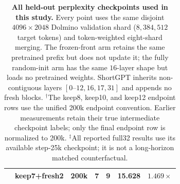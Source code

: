 \begin{table}[t]
{\begin{tabular}{@{}llrrrrr@{}}
& keep7+fresh2 & 200k & 7 & 9 & 15.628 & $1.469\times$ \\
\bottomrule
\end{tabular}%
}
\caption{\textbf{All held-out perplexity checkpoints used in this study.}
Every point uses the same disjoint $4096\times2048$ Dolmino validation shard
($8{,}384{,}512$ target tokens) and token-weighted eight-shard merging. The
frozen-front arm retains the same pretrained prefix but does not update it; the
fully random-init arm has the same $16$-layer shape but loads no pretrained
weights. ShortGPT inherits non-contiguous layers $[0\text{--}12,16,17,31]$
and appends no fresh blocks. $^{\dagger}$The keep8, keep10, and keep12 endpoint
rows use the unified 200k endpoint convention. Earlier measurements retain their true intermediate checkpoint labels; only the final endpoint row is normalized to 200k.
$^{\ddagger}$All reported full32 results
use its available step-25k checkpoint; it is not a long-horizon matched
counterfactual.}
\label{tab:app-ppl}
\end{table}
